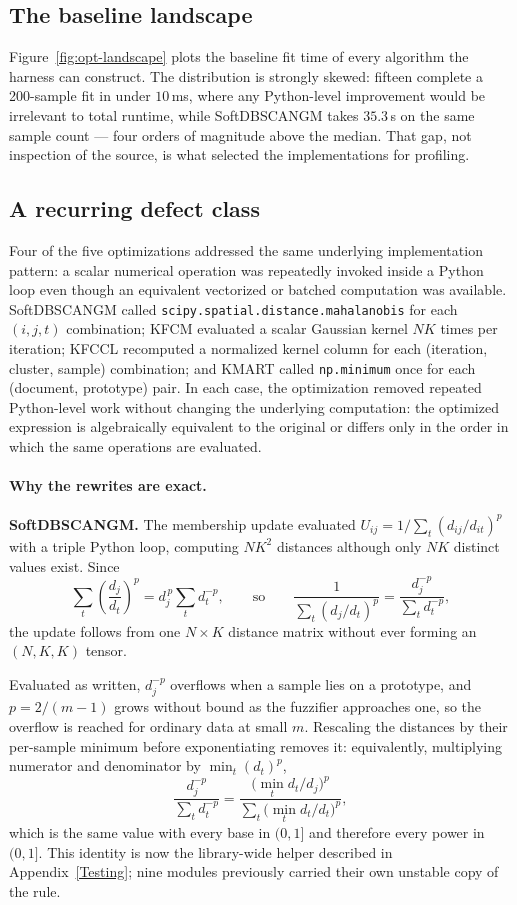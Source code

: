 \documentclass[twoside,11pt]{article}
\begin{document}
\subsection{The baseline landscape}

Figure~\ref{fig:opt-landscape} plots the baseline fit time of every algorithm
the harness can construct. The distribution is strongly skewed: fifteen
complete a 200-sample fit in under $10$\,ms, where any Python-level
improvement would be irrelevant to total runtime, while SoftDBSCANGM takes
$35.3$\,s on the same sample count --- four orders of magnitude above the
median. That gap, not inspection of the source, is what selected the
implementations for profiling.

\subsection{A recurring defect class}\label{app:opt:exact}

Four of the five optimizations addressed the same underlying implementation
pattern: a scalar numerical operation was repeatedly invoked inside a Python
loop even though an equivalent vectorized or batched computation was available.
SoftDBSCANGM called \texttt{scipy.spatial.distance.mahalanobis} for each
$(i,j,t)$ combination; KFCM evaluated a scalar Gaussian kernel $NK$ times per
iteration; KFCCL recomputed a normalized kernel column for each
(iteration, cluster, sample) combination; and KMART called \texttt{np.minimum}
once for each (document, prototype) pair. In each case, the optimization
removed repeated Python-level work without changing the underlying computation:
the optimized expression is algebraically equivalent to the original or differs
only in the order in which the same operations are evaluated.

\paragraph{Why the rewrites are exact. }\textbf{SoftDBSCANGM.} The membership update evaluated
$U_{ij} = 1 / \sum_t (d_{ij}/d_{it})^{p}$ with a triple Python loop, computing
$NK^2$ distances although only $NK$ distinct values exist. Since
\[
\sum_t \left(\frac{d_j}{d_t}\right)^{p} = d_j^{\,p} \sum_t d_t^{-p},
\qquad\text{so}\qquad
\frac{1}{\sum_t (d_j/d_t)^{p}} = \frac{d_j^{-p}}{\sum_t d_t^{-p}},
\]
the update follows from one $N \times K$ distance matrix without ever forming
an $(N,K,K)$ tensor.

Evaluated as written, $d_j^{-p}$ overflows when a sample lies on a prototype,
and $p = 2/(m-1)$ grows without bound as the fuzzifier approaches one, so the
overflow is reached for ordinary data at small $m$. Rescaling the distances
by their per-sample minimum before exponentiating removes it: equivalently,
multiplying numerator and denominator by $\min_t (d_t)^{p}$,
\[
\frac{d_j^{-p}}{\sum_t d_t^{-p}}
= \frac{\big(\min_t d_t / d_j\big)^{p}}
       {\sum_t \big(\min_t d_t / d_t\big)^{p}} ,
\]
which is the same value with every base in $(0, 1]$ and therefore every power
in $(0, 1]$. This identity is now the library-wide helper described in
Appendix~\ref{Testing}; nine modules previously carried their own unstable
copy of the rule.
\end{document}
